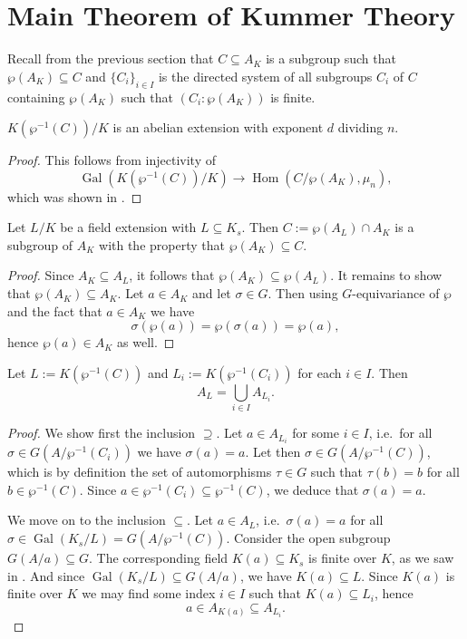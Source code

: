 \documentclass[12pt]{amsart}
\DeclareMathOperator{\Hom}{Hom}
\DeclareMathOperator{\Gal}{Gal}
\begin{document}
\section{Main Theorem of Kummer Theory}

Recall from the previous section that $C\subseteq A_{K}$ is a subgroup such that $\wp(A_{K})\subseteq C$ and $\{ C_{i} \}_{i\in I}$ is the directed system of all subgroups $C_{i}$ of $C$ containing $\wp(A_{K})$ such that $(C_{i}:\wp(A_{K}))$ is finite.

\begin{lm}\label{lm:fieldwelldefined}
    $K(\wp^{-1}(C))/K$ is an abelian extension with exponent $d$ dividing $n$.
    \begin{proof}
	This follows from injectivity of 
	\[ \Gal(K(\wp^{-1}(C))/K)\to \Hom(C/\wp(A_{K}),\mu_{n}), \]
	which was shown in .
    \end{proof}
\end{lm}

\begin{lm}\label{lm:groupwelldefined}
    Let $L/K$ be a field extension with $L\subseteq K_{s}$.
    Then $C:=\wp(A_{L})\cap A_{K}$ is a subgroup of $A_{K}$ with the property that $\wp(A_{K})\subseteq C$.
    \begin{proof}
	Since $A_{K}\subseteq A_{L}$, it follows that $\wp(A_{K})\subseteq \wp(A_{L})$.
	It remains to show that $\wp(A_{K})\subseteq A_{K}$.
	Let $a\in A_{K}$ and let $\sigma \in G$.
	Then using $G$-equivariance of $\wp$ and the fact that $a\in A_{K}$ we have
	\[ \sigma(\wp(a))=\wp(\sigma(a))=\wp(a), \]
	hence $\wp(a)\in A_{K}$ as well.
    \end{proof}
\end{lm}

\begin{lm}\label{lm:coefficients}
    Let $L:=K(\wp^{-1}(C))$ and $L_{i}:=K(\wp^{-1}(C_{i}))$ for each $i\in I$.
    Then
    \[ A_{L}=\bigcup_{i\in I}A_{L_{i}}. \]
    \begin{proof}
	We show first the inclusion $\supseteq $.
	Let $a\in A_{L_{i}}$ for some $i\in I$, i.e.~for all $\sigma\in G(A/\wp^{-1}(C_{i}))$ we have $\sigma(a)=a$.
	Let then $\sigma\in G(A/\wp^{-1}(C))$, which is by definition the set of automorphisms $\tau\in G$ such that $\tau(b)=b$ for all $b\in \wp^{-1}(C)$.
	Since $a\in \wp^{-1}(C_{i})\subseteq \wp^{-1}(C)$, we deduce that $\sigma(a)=a$.

	We move on to the inclusion $\subseteq $.
	Let $a\in A_{L}$, i.e.~$\sigma(a)=a$ for all $\sigma\in \Gal(K_{s}/L)=G(A/\wp^{-1}(C))$.
	Consider the open subgroup $G(A/a)\subseteq G$.
	The corresponding field $K(a)\subseteq K_{s}$ is finite over $K$, as we saw in .
	And since $\Gal(K_{s}/L)\subseteq G(A/a)$, we have $K(a)\subseteq L$.
	Since $K(a)$ is finite over $K$ we may find some index $i\in I$ such that $K(a)\subseteq L_{i}$, hence
	\[ a\in A_{K(a)}\subseteq A_{L_{i}}. \]
    \end{proof}
\end{lm}
\end{document}
